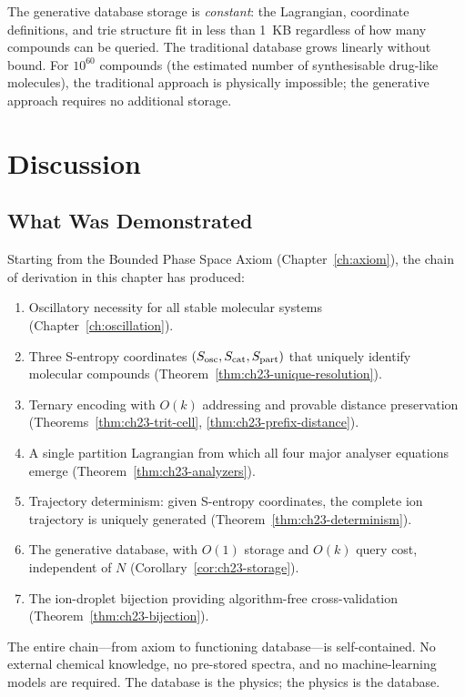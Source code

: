 The generative database storage is \emph{constant}: the Lagrangian, coordinate
definitions, and trie structure fit in less than 1~KB regardless of how many
compounds can be queried.  The traditional database grows linearly without
bound.  For $10^{60}$ compounds (the estimated number of synthesisable
drug-like molecules), the traditional approach is physically impossible; the
generative approach requires no additional storage.

\section{Discussion}
\label{sec:ch23-discussion}

\subsection{What Was Demonstrated}
\label{sec:ch23-demonstrated}

Starting from the Bounded Phase Space Axiom (Chapter~\ref{ch:axiom}), the
chain of derivation in this chapter has produced:
\begin{enumerate}
  \item Oscillatory necessity for all stable molecular systems
    (Chapter~\ref{ch:oscillation}).
  \item Three S-entropy coordinates $(S_{\mathrm{osc}}, S_{\mathrm{cat}}, S_{\mathrm{part}})$ that uniquely identify
    molecular compounds (Theorem~\ref{thm:ch23-unique-resolution}).
  \item Ternary encoding with $O(k)$ addressing and provable distance
    preservation (Theorems~\ref{thm:ch23-trit-cell}, \ref{thm:ch23-prefix-distance}).
  \item A single partition Lagrangian from which all four major analyser
    equations emerge (Theorem~\ref{thm:ch23-analyzers}).
  \item Trajectory determinism: given S-entropy coordinates, the complete
    ion trajectory is uniquely generated
    (Theorem~\ref{thm:ch23-determinism}).
  \item The generative database, with $O(1)$ storage and $O(k)$ query cost,
    independent of $N$ (Corollary~\ref{cor:ch23-storage}).
  \item The ion-droplet bijection providing algorithm-free cross-validation
    (Theorem~\ref{thm:ch23-bijection}).
\end{enumerate}

The entire chain---from axiom to functioning database---is self-contained.
No external chemical knowledge, no pre-stored spectra, and no machine-learning
models are required.  The database is the physics; the physics is the database.

